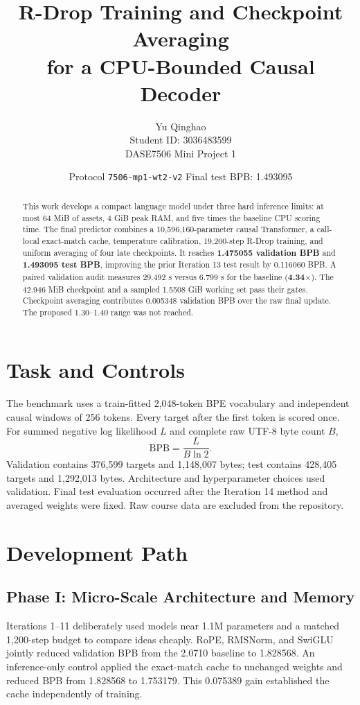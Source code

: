 \documentclass[10pt,a4paper]{article}
\title{\textbf{R-Drop Training and Checkpoint Averaging\\for a CPU-Bounded Causal Decoder}}
\author{Yu Qinghao\\Student ID: 3036483599\\\small DASE7506 Mini Project 1}
\date{Protocol \texttt{7506-mp1-wt2-v2} \quad Final test BPB: 1.493095}
\newcommand{\bpb}{\mathrm{BPB}}
\begin{document}
\maketitle

\begin{abstract}
This work develops a compact language model under three hard inference limits: at most 64 MiB of assets, 4 GiB peak RAM, and five times the baseline CPU scoring time. The final predictor combines a 10,596,160-parameter causal Transformer, a call-local exact-match cache, temperature calibration, 19,200-step R-Drop training, and uniform averaging of four late checkpoints. It reaches \textbf{1.475055 validation BPB} and \textbf{1.493095 test BPB}, improving the prior Iteration 13 test result by 0.116060 BPB. A paired validation audit measures 29.492 s versus 6.799 s for the baseline (\textbf{4.34$\times$}). The 42.946 MiB checkpoint and a sampled 1.5508 GiB working set pass their gates. Checkpoint averaging contributes 0.005348 validation BPB over the raw final update. The proposed 1.30--1.40 range was not reached.
\end{abstract}

\section{Task and Controls}
The benchmark uses a train-fitted 2,048-token BPE vocabulary and independent causal windows of 256 tokens. Every target after the first token is scored once. For summed negative log likelihood $L$ and complete raw UTF-8 byte count $B$,
\begin{equation}\label{eq:bpb}
\bpb=\frac{L}{B\ln 2}.
\end{equation}
Validation contains 376,599 targets and 1,148,007 bytes; test contains 428,405 targets and 1,292,013 bytes. Architecture and hyperparameter choices used validation. Final test evaluation occurred after the Iteration 14 method and averaged weights were fixed. Raw course data are excluded from the repository.

\section{Development Path}
\subsection{Phase I: Micro-Scale Architecture and Memory}
Iterations 1--11 deliberately used models near 1.1M parameters and a matched 1,200-step budget to compare ideas cheaply. RoPE, RMSNorm, and SwiGLU jointly reduced validation BPB from the 2.0710 baseline to 1.828568. An inference-only control applied the exact-match cache to unchanged weights and reduced BPB from 1.828568 to 1.753179. This 0.075389 gain established the cache independently of training.
\end{document}
